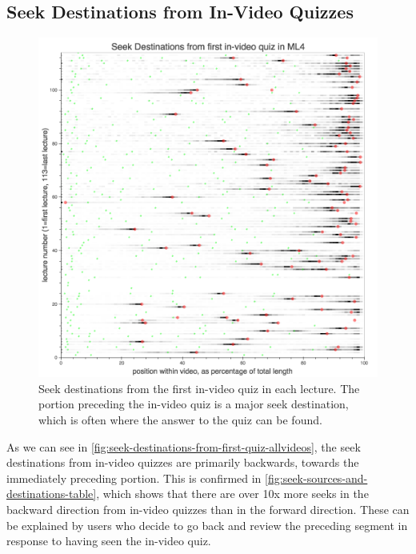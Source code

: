 \documentclass{sigchi}
\begin{document}

\subsection{Seek Destinations from In-Video Quizzes}

\begin{figure}
\includegraphics[width=1.0\columnwidth]{seek-destinations-from-first-quiz-allvideos}
\caption{Seek destinations from the first in-video quiz in each lecture. The portion preceding the in-video quiz is a major seek destination, which is often where the answer to the quiz can be found.}
\label{fig:seek-destinations-from-first-quiz-allvideos}
\end{figure}

As we can see in \autoref{fig:seek-destinations-from-first-quiz-allvideos}, the seek destinations from in-video quizzes are primarily backwards, towards the immediately preceding portion. This is confirmed in \autoref{fig:seek-sources-and-destinations-table}, which shows that there are over 10x more seeks in the backward direction from in-video quizzes than in the forward direction. These can be explained by users who decide to go back and review the preceding segment in response to having seen the in-video quiz.

\end{document}
